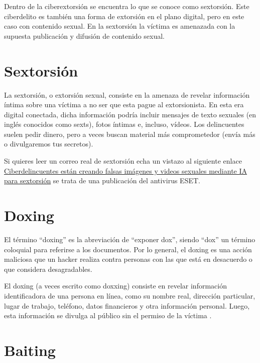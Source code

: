 \documentclass[
  a4paper,
  openany]{book}
\begin{document}
Dentro de la ciberextorsión se encuentra lo que se conoce como sextorsión. Este ciberdelito es también una forma de extorsión en el plano digital, pero en este caso con contenido sexual. En la sextorsión la víctima es amenazada con la supuesta publicación y difusión de contenido sexual.

\hypertarget{sextorsiuxf3n}{%
\section{Sextorsión}\label{sextorsiuxf3n}}

La sextorsión, o extorsión sexual, consiste en la amenaza de revelar información íntima sobre una víctima a no ser que esta pague al extorsionista. En esta era digital conectada, dicha información podría incluir mensajes de texto sexuales (en inglés conocidos como sexts), fotos íntimas e, incluso, vídeos. Los delincuentes suelen pedir dinero, pero a veces buscan material más comprometedor (envía más o divulgaremos tus secretos)\citep{KASPER-sextorsión}.

Si quieres leer un correo real de sextorsión echa un vistazo al siguiente enlace \href{https://www.welivesecurity.com/la-es/2023/06/09/ciberdelincuentes-falsas-imagenes-videos-sexuales-mediante-inteligencia-artificial-sextorsion/}{Ciberdelincuentes están creando falsas imágenes y videos sexuales mediante IA para sextorsión} se trata de una publicación del antivirus ESET.

\hypertarget{doxing}{%
\section{Doxing}\label{doxing}}

El término ``doxing'' es la abreviación de ``exponer dox'', siendo ``dox'' un término coloquial para referirse a los documentos. Por lo general, el doxing es una acción maliciosa que un hacker realiza contra personas con las que está en desacuerdo o que considera desagradables.

El doxing (a veces escrito como doxxing) consiste en revelar información identificadora de una persona en línea, como su nombre real, dirección particular, lugar de trabajo, teléfono, datos financieros y otra información personal. Luego, esta información se divulga al público sin el permiso de la víctima \citep{KASPER-doxing}.

\hypertarget{baiting}{%
\section{Baiting}\label{baiting}}
\end{document}
